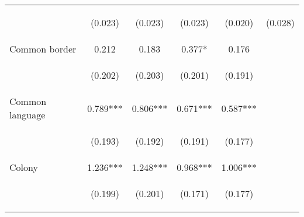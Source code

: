 \begin{center}
\begin{tabular}{lccccc}
\vspace{4pt} & \begin{footnotesize}(0.023)\end{footnotesize} & \begin{footnotesize}(0.023)\end{footnotesize} & \begin{footnotesize}(0.023)\end{footnotesize} & \begin{footnotesize}(0.020)\end{footnotesize} & \begin{footnotesize}(0.028)\end{footnotesize} \\
Common border & 0.212 & 0.183 & 0.377* & 0.176 &  \\
\vspace{4pt} & \begin{footnotesize}(0.202)\end{footnotesize} & \begin{footnotesize}(0.203)\end{footnotesize} & \begin{footnotesize}(0.201)\end{footnotesize} & \begin{footnotesize}(0.191)\end{footnotesize} & \begin{footnotesize}\end{footnotesize} \\
Common language & 0.789*** & 0.806*** & 0.671*** & 0.587*** &  \\
\vspace{4pt} & \begin{footnotesize}(0.193)\end{footnotesize} & \begin{footnotesize}(0.192)\end{footnotesize} & \begin{footnotesize}(0.191)\end{footnotesize} & \begin{footnotesize}(0.177)\end{footnotesize} & \begin{footnotesize}\end{footnotesize} \\
Colony & 1.236*** & 1.248*** & 0.968*** & 1.006*** &  \\
\vspace{4pt} & \begin{footnotesize}(0.199)\end{footnotesize} & \begin{footnotesize}(0.201)\end{footnotesize} & \begin{footnotesize}(0.171)\end{footnotesize} & \begin{footnotesize}(0.177)\end{footnotesize} & \begin{footnotesize}\end{footnotesize} \\

\end{tabular}
\end{center}
